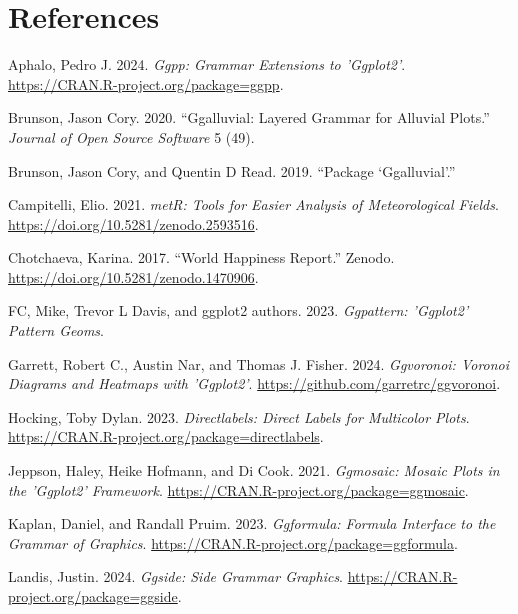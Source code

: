 \documentclass[
  letterpaper,
  DIV=11,
  numbers=noendperiod]{scrreprt}
\newlength{\cslhangindent}
\newenvironment{CSLReferences}[2] %
 {\begin{list}{}{%
  \setlength{\itemindent}{0pt}
  \setlength{\leftmargin}{0pt}
  \setlength{\parsep}{0pt}
  \ifodd #1
   \setlength{\leftmargin}{\cslhangindent}
   \setlength{\itemindent}{-1\cslhangindent}
  \fi
  \setlength{\itemsep}{#2\baselineskip}}}
 {\end{list}}
\begin{document}
\chapter*{References}\label{references}


\label{refs}
\begin{CSLReferences}{1}{0}
Aphalo, Pedro J. 2024. \emph{Ggpp: Grammar Extensions to 'Ggplot2'}.
\url{https://CRAN.R-project.org/package=ggpp}.

Brunson, Jason Cory. 2020. {``Ggalluvial: Layered Grammar for Alluvial
Plots.''} \emph{Journal of Open Source Software} 5 (49).

Brunson, Jason Cory, and Quentin D Read. 2019. {``Package
{`Ggalluvial'}.''}

Campitelli, Elio. 2021. \emph{metR: Tools for Easier Analysis of
Meteorological Fields}. \url{https://doi.org/10.5281/zenodo.2593516}.

Chotchaeva, Karina. 2017. {``World Happiness Report.''} Zenodo.
\url{https://doi.org/10.5281/zenodo.1470906}.

FC, Mike, Trevor L Davis, and ggplot2 authors. 2023. \emph{Ggpattern:
'Ggplot2' Pattern Geoms}.

Garrett, Robert C., Austin Nar, and Thomas J. Fisher. 2024.
\emph{Ggvoronoi: Voronoi Diagrams and Heatmaps with 'Ggplot2'}.
\url{https://github.com/garretrc/ggvoronoi}.

Hocking, Toby Dylan. 2023. \emph{Directlabels: Direct Labels for
Multicolor Plots}.
\url{https://CRAN.R-project.org/package=directlabels}.

Jeppson, Haley, Heike Hofmann, and Di Cook. 2021. \emph{Ggmosaic: Mosaic
Plots in the 'Ggplot2' Framework}.
\url{https://CRAN.R-project.org/package=ggmosaic}.

Kaplan, Daniel, and Randall Pruim. 2023. \emph{Ggformula: Formula
Interface to the Grammar of Graphics}.
\url{https://CRAN.R-project.org/package=ggformula}.

Landis, Justin. 2024. \emph{Ggside: Side Grammar Graphics}.
\url{https://CRAN.R-project.org/package=ggside}.


\end{CSLReferences}
\end{document}
